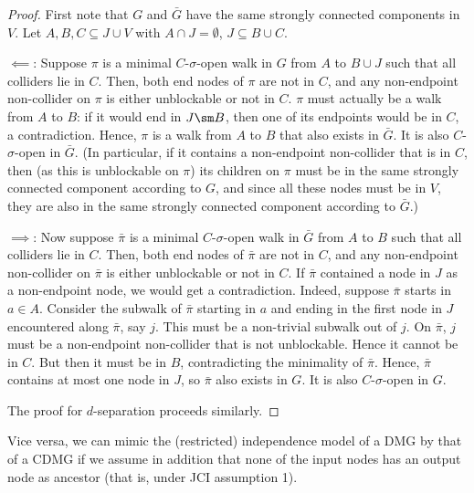 \begin{proof}
  First note that $G$ and $\bar{G}$ have the same strongly connected components in $V$. 
  Let $A, B, C \subseteq J \cup V$ with $A \cap J = \emptyset$, $J \subseteq B \cup C$.
  
  $\impliedby$: Suppose $\pi$ is a minimal $C$-$\sigma$-open walk in $G$ from $A$ to $B \cup J$ such that all colliders lie in $C$.
  Then, both end nodes of $\pi$ are not in $C$, and any non-endpoint non-collider on $\pi$ is either unblockable or not in $C$.
  $\pi$ must actually be a walk from $A$ to $B$:
  if it would end in $J \sm B$, then one of its endpoints would be in $C$, a contradiction.
  Hence, $\pi$ is a walk from $A$ to $B$ that also exists in $\bar{G}$.
  It is also $C$-$\sigma$-open in $\bar{G}$.
  (In particular, if it contains a non-endpoint non-collider that is in $C$, then (as this is unblockable on $\pi$) its children on $\pi$ must be in the same strongly connected component according to $G$, and since all these nodes must be in $V$, they are also in the same strongly connected component according to $\bar{G}$.)

  $\implies$: Now suppose $\bar{\pi}$ is a minimal $C$-$\sigma$-open walk in $\bar{G}$ from $A$ to $B$ such that all colliders lie in $C$.
  Then, both end nodes of $\bar{\pi}$ are not in $C$, and any non-endpoint non-collider on $\bar{\pi}$ is either unblockable or not in $C$.
  If $\bar{\pi}$ contained a node in $J$ as a non-endpoint node, we would get a contradiction.
  Indeed, suppose $\bar{\pi}$ starts in $a \in A$.
  Consider the subwalk of $\bar{\pi}$ starting in $a$ and ending in the first node in $J$ encountered along $\bar{\pi}$, say $j$.
  This must be a non-trivial subwalk out of $j$.
  On $\bar{\pi}$, $j$ must be a non-endpoint non-collider that is not unblockable.
  Hence it cannot be in $C$. 
  But then it must be in $B$, contradicting the minimality of $\bar{\pi}$. 
  Hence, $\bar{\pi}$ contains at most one node in $J$, so $\bar{\pi}$ also exists in $G$. 
  It is also $C$-$\sigma$-open in $G$.

  The proof for $d$-separation proceeds similarly.
\end{proof}
Vice versa, we can mimic the (restricted) independence model of a DMG by that of a CDMG if we assume in addition that
none of the input nodes has an output node as ancestor (that is, under JCI assumption 1).
